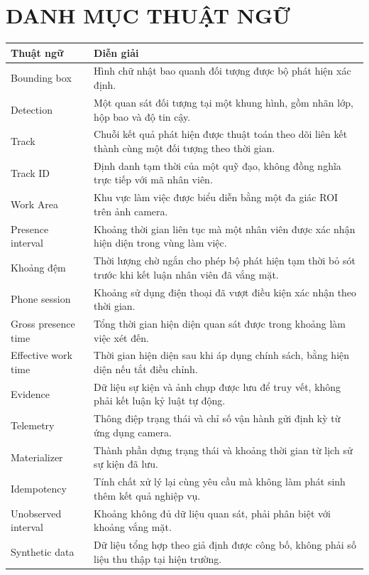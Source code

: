 \section*{DANH MỤC THUẬT NGỮ}
\begin{longtable}{p{3.8cm}p{9.7cm}}
\textbf{Thuật ngữ} & \textbf{Diễn giải}\\\endfirsthead
Bounding box & Hình chữ nhật bao quanh đối tượng được bộ phát hiện xác định.\\
Detection & Một quan sát đối tượng tại một khung hình, gồm nhãn lớp, hộp bao và độ tin cậy.\\
Track & Chuỗi kết quả phát hiện được thuật toán theo dõi liên kết thành cùng một đối tượng theo thời gian.\\
Track ID & Định danh tạm thời của một quỹ đạo, không đồng nghĩa trực tiếp với mã nhân viên.\\
Work Area & Khu vực làm việc được biểu diễn bằng một đa giác ROI trên ảnh camera.\\
Presence interval & Khoảng thời gian liên tục mà một nhân viên được xác nhận hiện diện trong vùng làm việc.\\
Khoảng đệm & Thời lượng chờ ngắn cho phép bộ phát hiện tạm thời bỏ sót trước khi kết luận nhân viên đã vắng mặt.\\
Phone session & Khoảng sử dụng điện thoại đã vượt điều kiện xác nhận theo thời gian.\\
Gross presence time & Tổng thời gian hiện diện quan sát được trong khoảng làm việc xét đến.\\
Effective work time & Thời gian hiện diện sau khi áp dụng chính sách, bằng hiện diện nếu tắt điều chỉnh.\\
Evidence & Dữ liệu sự kiện và ảnh chụp được lưu để truy vết, không phải kết luận kỷ luật tự động.\\
Telemetry & Thông điệp trạng thái và chỉ số vận hành gửi định kỳ từ ứng dụng camera.\\
Materializer & Thành phần dựng trạng thái và khoảng thời gian từ lịch sử sự kiện đã lưu.\\
Idempotency & Tính chất xử lý lại cùng yêu cầu mà không làm phát sinh thêm kết quả nghiệp vụ.\\
Unobserved interval & Khoảng không đủ dữ liệu quan sát, phải phân biệt với khoảng vắng mặt.\\
Synthetic data & Dữ liệu tổng hợp theo giả định được công bố, không phải số liệu thu thập tại hiện trường.\\
\end{longtable}
\clearpage
